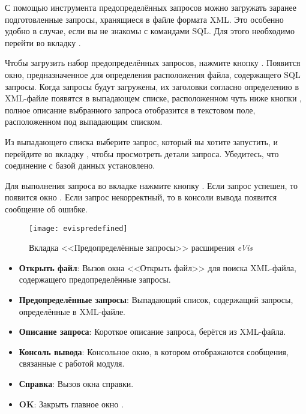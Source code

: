 С помощью инструмента предопределённых запросов можно загружать заранее
подготовленные запросы, хранящиеся в файле формата XML. Это особенно удобно
в случае, если вы не знакомы с командами SQL. Для этого необходимо перейти
во вкладку .

Чтобы загрузить набор предопределённых запросов, нажмите кнопку
. Появится окно, предназначенное для
определения расположения файла, содержащего SQL запросы. Когда запросы будут
загружены, их заголовки согласно определению в XML-файле появятся в выпадающем
списке, расположенном чуть ниже кнопки ,
полное описание выбранного запроса отобразится в текстовом поле, расположенном
под выпадающим списком.

Из выпадающего списка выберите запрос, который вы хотите запустить, и перейдите
во вкладку , чтобы просмотреть детали запроса. Убедитесь, что
соединение с базой данных установлено.

Для выполнения запроса во вкладке  нажмите кнопку
. Если запрос успешен, то появится окно .
Если запрос некорректный, то в консоли вывода появится сообщение об ошибке.

\begin{figure}[htp]
   \centering
   \texttt{[image: evispredefined]}
   \caption{\label{evispredefined}Вкладка <<Предопределённые запросы>> расширения
   \emph{eVis} \wincaption}
\end{figure}

\begin{itemize}[label=--]
\item \textbf{Открыть файл}: Вызов окна <<Открыть файл>> для поиска
XML-файла, содержащего предопределённые запросы.
\item \textbf{Предопределённые запросы}: Выпадающий список, содержащий запросы,
определённые в XML-файле.
\item \textbf{Описание запроса}: Короткое описание запроса, берётся из
XML-файла.
\item \textbf{Консоль вывода}: Консольное окно, в котором отображаются
сообщения, связанные с работой модуля.
\item \textbf{Справка}: Вызов окна справки.
\item \textbf{OK}: Закрыть главное окно .
\end{itemize}

\label{evis_xml_format}

